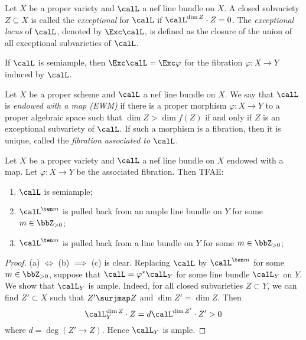     \begin{definition}\label{def:exceptional_locus_of_nef_line_bundle}
        Let \(X\) be a proper variety and \(\calL\) a nef line bundle on \(X\).
        A closed subvariety \(Z \subseteq X\) is called the \emph{exceptional} for \(\calL\) if \(\calL^{\dim Z} \cdot Z = 0\).
        The \emph{exceptional locus} of \(\calL\), denoted by \(\Exc \calL\), is defined as the closure of the union of all exceptional subvarieties of \(\calL\).
    \end{definition}

    If \(\calL\) is semiample, then \(\Exc \calL = \Exc \varphi\) for the fibration \(\varphi: X \to Y\) induced by \(\calL\).

    \begin{definition}\label{def:EWM_bpf_semiample}
        Let \(X\) be a proper scheme and \(\calL\) a nef line bundle on \(X\).
        We say that \(\calL\) is \emph{endowed with a map (EWM)} if there is a proper morphism \(\varphi: X \to Y\) to a proper algebraic space such that \(\dim Z > \dim f(Z)\) if and only if \(Z\) is an exceptional subvariety of \(\calL\).
        If such a morphism is a fibration, then it is unique, called the \emph{fibration associated to \(\calL\)}.
    \end{definition}

    \begin{proposition}\label{lem:fundamental_properties_of_EWM}
        Let \(X\) be a proper variety and \(\calL\) a nef line bundle on \(X\) endowed with a map.
        Let \(\varphi: X \to Y\) be the associated fibration.
        Then TFAE:
        \begin{enumerate}
            \item \(\calL\) is semiample;
            \item \(\calL^{\ten m}\) is pulled back from an ample line bundle on \(Y\) for some \(m \in \bbZ_{>0}\);
            \item \(\calL^{\ten m}\) is pulled back from a line bundle on \(Y\) for some \(m \in \bbZ_{>0}\);
        \end{enumerate}
    \end{proposition}
    \begin{proof}
        (a) \(\Leftrightarrow \) (b) \(\implies\) (c) is clear.
        Replacing \(\calL\) by \(\calL^{\ten m}\) for some \(m \in \bbZ_{>0}\), suppose that \(\calL = \varphi^*\calL_Y\) for some line bundle \(\calL_Y\) on \(Y\).
        We show that \(\calL_Y\) is ample.
        Indeed, for all closed subvarieties \(Z \subset Y\), we can find \(Z' \subset X\) such that \(Z' \surjmap Z\) and \(\dim Z' = \dim Z\).
        Then 
        \[ \calL_Y^{\dim Z} \cdot Z = d \calL^{\dim Z'} \cdot Z' > 0 \]
        where \(d = \deg(Z' \to Z)\).
        Hence \(\calL_Y\) is ample.
    \end{proof}

